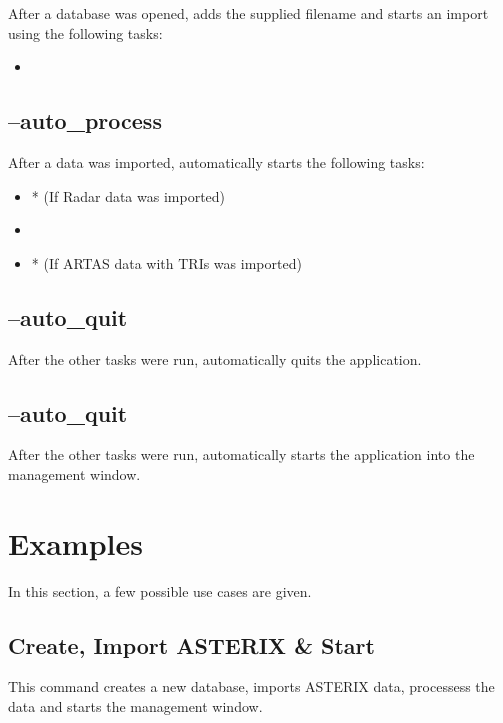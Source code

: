 After a database was opened, adds the supplied filename and starts an import using the following tasks:

\begin{itemize}
 \item {}
\end{itemize}

\subsection{--auto\_process}

After a data was imported, automatically starts the following tasks:

\begin{itemize}
 \item {}* (If Radar data was imported)
 \item {}
 \item {}* (If ARTAS data with TRIs was imported)
\end{itemize}

\subsection{--auto\_quit}

After the other tasks were run, automatically quits the application.

\subsection{--auto\_quit}

After the other tasks were run, automatically starts the application into the management window.


\section{Examples}

In this section, a few possible use cases are given.

\subsection{Create, Import ASTERIX \& Start}

This command creates a new database, imports ASTERIX data, processess the data and starts the management window.


